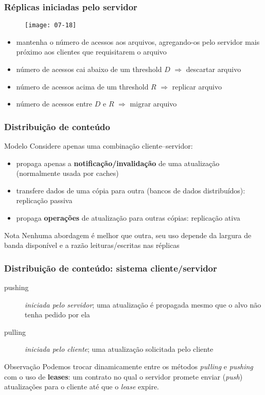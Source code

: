 \documentclass[Ligatures=TeX,table,brazil,svgnames,usetotalslideindicator,compress,10pt]{beamer}
\begin{document}
\begin{frame}
  \frametitle{Réplicas iniciadas pelo servidor}
  \begin{figure}
    \centering
    \texttt{[image: 07-18]}
  \end{figure}
  \begin{itemize}
  \item mantenha o número de acessos aos arquivos, agregando-os pelo servidor mais próximo aos clientes que requisitarem o arquivo
  \item número de acessos cai abaixo de um threshold $D$ $\Rightarrow$ descartar arquivo
  \item número de acessos acima de um threshold $R$ $\Rightarrow$ replicar arquivo
  \item número de acessos entre $D$ e $R$  $\Rightarrow$ migrar arquivo
  \end{itemize}
\end{frame}

\begin{frame}
  \frametitle{Distribuição de conteúdo}
  \begin{block}{Modelo}
    Considere apenas uma combinação cliente--servidor:
    \begin{itemize}
    \item propaga apenas a \textbf{notificação/invalidação} de uma atualização (normalmente usada por caches)
    \item transfere dados de uma cópia para outra (bancos de dados distribuídos): \alert{replicação passiva}
    \item propaga \textbf{operações} de atualização para outras cópias: \alert{replicação ativa}
    \end{itemize}
  \end{block}

  \begin{alertblock}{Nota}
    Nenhuma abordagem é melhor que outra, seu uso depende da largura de banda disponível e a razão leituras/escritas nas réplicas
  \end{alertblock}
\end{frame}

\begin{frame}
  \frametitle{Distribuição de conteúdo: sistema cliente/servidor}
  \begin{description}
  \item[pushing] \emph{iniciada pelo servidor};  uma atualização é propagada mesmo que o alvo não tenha pedido por ela
  \item[pulling] \emph{iniciada pelo cliente}; uma atualização solicitada pelo cliente
  \end{description}

  \begin{block}{Observação}
    Podemos trocar dinamicamente entre os métodos \textit{pulling} e \textit{pushing} com o uso de \textbf{leases}: um contrato no qual o servidor promete enviar (\textit{push}) atualizações para o cliente até que o \textit{lease} expire.
  \end{block}

\end{frame}
\end{document}
